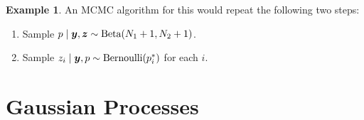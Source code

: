 \documentclass[
]{book}
\providecommand{\tightlist}{%
  \setlength{\itemsep}{0pt}\setlength{\parskip}{0pt}}
\theoremstyle{definition}
\theoremstyle{definition}
\newtheorem{example}{Example}[chapter]
\theoremstyle{definition}
\theoremstyle{definition}
\theoremstyle{remark}
\begin{document}
\begin{example}
An MCMC algorithm for this would repeat the following two steps:

\begin{enumerate}
\def\labelenumi{\arabic{enumi}.}
\tightlist
\item
  Sample \(p \mid \boldsymbol{y}, \boldsymbol{z} \sim \hbox{Beta}(N_1 + 1, N_2 + 1)\).
\item
  Sample \(z_i \mid \boldsymbol{y}, p \sim \hbox{Bernoulli}(p^*_i)\) for each \(i\).
\end{enumerate}

\end{example}

\hypertarget{gaussian-processes}{%
\section{Gaussian Processes}\label{gaussian-processes}}

  
\end{document}
